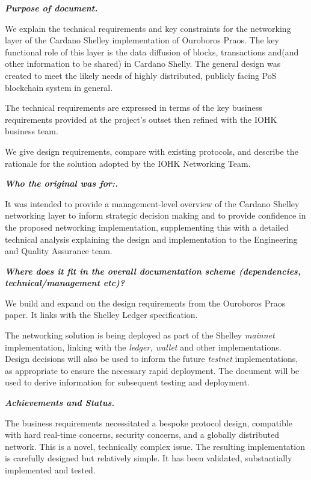 \documentclass[11pt,a4paper]{article}
\begin{document}
\emph{\textbf{Purpose of document.} }

We explain the technical requirements and key constraints for the
networking layer of the Cardano Shelley implementation of Ouroboros
Praos. The key functional role of this layer is the data diffusion of
blocks, transactions and(and other information to be shared) in Cardano
Shelly. The general design was created to meet the likely needs of
highly distributed, publicly facing PoS blockchain system in general.

The technical requirements are expressed in terms of the key business
requirements provided at the project's outset then refined with the IOHK
business team.

We give design requirements, compare with existing protocols, and
describe the rationale for the solution adopted by the IOHK Networking
Team.

\emph{\textbf{Who the original was for:. }}


It was intended to provide a management-level overview of the Cardano
Shelley networking layer to inform strategic decision making and to
provide confidence in the proposed networking implementation,
supplementing this with a detailed technical analysis explaining the
design and implementation to the Engineering and Quality Assurance team.

\emph{\textbf{Where does it fit in the overall documentation scheme
(dependencies, technical/management etc)?}}

We build and expand on the design requirements from the Ouroboros Praos
paper. It links with the Shelley Ledger specification.

The networking solution is being deployed as part of the Shelley
\emph{mainnet} implementation, linking with the \emph{ledger, wallet}
and other implementations. Design decisions will also be used to inform
the future \emph{testnet} implementations, as appropriate to ensure the
necessary rapid deployment. The document will be used to derive
information for subsequent testing and deployment.

\emph{\textbf{Achievements and Status. }}

The business requirements necessitated a bespoke protocol design,
compatible with hard real-time concerns, security concerns, and a
globally distributed network. This is a novel, technically complex
issue. The resulting implementation is carefully designed but relatively
simple. It has been validated, substantially implemented and tested.
\end{document}
